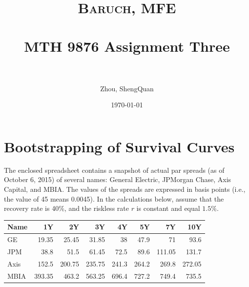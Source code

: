 \documentclass[paper=a4, fontsize=11pt]{scrartcl} %
\title{	
\normalfont \normalsize 
\textsc{Baruch, MFE} \\ [25pt] %
\horrule{0.5pt} \\[0.4cm] %
\huge MTH 9876 Assignment Three\\  %
\horrule{2pt} \\[0.5cm] %
}
\author{Zhou, ShengQuan} %
\date{\normalsize\today} %
\numberwithin{equation}{section} %
\numberwithin{figure}{section} %
\numberwithin{table}{section} %
\begin{document}
	


\maketitle %

\newpage



\section{Bootstrapping of Survival Curves}
The enclosed spreadsheet contains a snapshot of actual par spreads (as of October 6, 2015) of several
names: General Electric, JPMorgan Chase, Axis Capital, and MBIA. The values of the spreads are
expressed in basis points (i.e., the value of 45 means 0.0045). In the calculations below, assume that
the recovery rate is 40\%, and the riskless rate $r$ is constant and equal $1.5\%$.
\begin{center}
\begin{tabular}{l*{6}{r}r}
Name              & 1Y & 2Y & 3Y & 4Y & 5Y  & 7Y & 10Y \\
\hline
GE	& 19.35	& 25.45 &	31.85	& 38	& 47.9	& 71	& 93.6\\
JPM	& 38.8	& 51.5	& 61.45	& 72.5	& 89.6	& 111.05	& 131.7\\
Axis &	152.5	& 200.75	& 235.75	& 241.3	& 264.2	& 269.8	& 272.05\\
MBIA &	393.35	& 463.2	& 563.25	& 696.4	& 727.2	& 749.4	& 735.5\\
\end{tabular}
\end{center}
\end{document}
